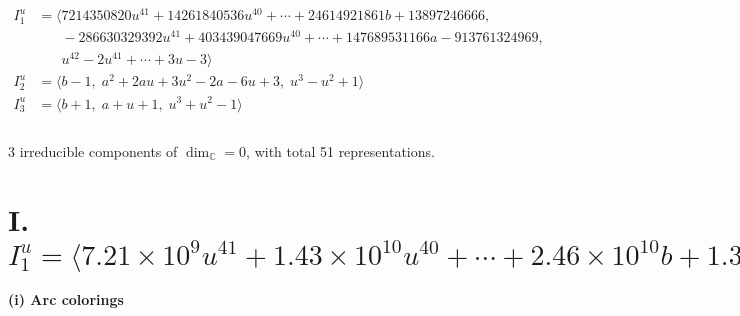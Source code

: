 \documentclass[1p]{elsarticle_modified}
\theoremstyle{definition}
\begin{document}
\begin{align*}
I^u_{1}&=\langle 
7214350820 u^{41}+14261840536 u^{40}+\cdots+24614921861 b+13897246666,\\
\phantom{I^u_{1}}&\phantom{= \langle  }-286630329392 u^{41}+403439047669 u^{40}+\cdots+147689531166 a-913761324969,\\
\phantom{I^u_{1}}&\phantom{= \langle  }u^{42}-2 u^{41}+\cdots+3 u-3\rangle \\
I^u_{2}&=\langle 
b-1,\;a^2+2 a u+3 u^2-2 a-6 u+3,\;u^3- u^2+1\rangle \\
I^u_{3}&=\langle 
b+1,\;a+u+1,\;u^3+u^2-1\rangle \\
\\
\end{align*}
\raggedright * 3 irreducible components of $\dim_{\mathbb{C}}=0$, with total 51 representations.\\
\newpage
\renewcommand{\arraystretch}{1}
\centering \section*{I. $I^u_{1}= \langle 7.21\times10^{9} u^{41}+1.43\times10^{10} u^{40}+\cdots+2.46\times10^{10} b+1.39\times10^{10},\;-2.87\times10^{11} u^{41}+4.03\times10^{11} u^{40}+\cdots+1.48\times10^{11} a-9.14\times10^{11},\;u^{42}-2 u^{41}+\cdots+3 u-3 \rangle$}
\flushleft \textbf{(i) Arc colorings}\\
\end{document}
